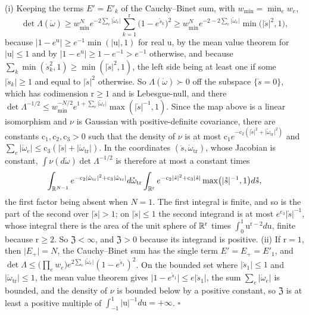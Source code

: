 (i) Keeping the terms \(E'=E'_k\) of the Cauchy--Binet sum, with \(w_{\min}=\min_ew_e\),
\[
\det\Lambda(\mathring\omega)
\geq w_{\min}^Ne^{-2\sum_e\lvert\mathring\omega_e\rvert}\sum_{k=1}^{\mathrm r}\bigl(1-e^{\mathring s_k}\bigr)^2
\geq w_{\min}^Ne^{-2-2\sum_e\lvert\mathring\omega_e\rvert}\min\bigl(\lvert\mathring s\rvert^2,1\bigr),
\]
because \(\lvert1-e^{\mathrm u}\rvert\geq e^{-1}\min(\lvert\mathrm u\rvert,1)\) for real \(\mathrm u\), by the mean
value theorem for \(\lvert\mathrm u\rvert\leq1\) and by \(\lvert1-e^{\mathrm u}\rvert\geq1-e^{-1}>e^{-1}\)
otherwise, and because \(\sum_k\min(\mathring s_k^2,1)\geq\min(\lvert\mathring s\rvert^2,1)\), the left side
being at least one if some \(\lvert\mathring s_k\rvert\geq1\) and equal to \(\lvert\mathring s\rvert^2\) otherwise.
So \(\Lambda(\mathring\omega)\succ0\) off the subspace \(\{\mathring s=0\}\), which has codimension
\(\mathrm r\geq1\) and is Lebesgue-null, and there
\(\det\Lambda^{-1/2}\leq w_{\min}^{-N/2}e^{1+\sum_e\lvert\mathring\omega_e\rvert}\max(\lvert\mathring s\rvert^{-1},1)\).
Since the map above is a linear isomorphism and \(\nu\) is Gaussian with positive-definite covariance,
there are constants \(\mathrm c_1,\mathrm c_2,\mathrm c_3>0\) such that the density of \(\nu\) is at most
\(\mathrm c_1e^{-\mathrm c_2(\lvert\mathring s\rvert^2+\lvert\mathring\omega_{\mathrm{tr}}\rvert^2)}\) and
\(\sum_e\lvert\mathring\omega_e\rvert\leq\mathrm c_3(\lvert\mathring s\rvert+\lvert\mathring\omega_{\mathrm{tr}}\rvert)\). In
the coordinates \((\mathring s,\mathring\omega_{\mathrm{tr}})\), whose Jacobian is constant,
\(\int\nu(d\mathring\omega)\det\Lambda^{-1/2}\) is therefore at most a constant times
\[
\int_{\mathbb R^{N-1}}e^{-\mathrm c_2\lvert\mathring\omega_{\mathrm{tr}}\rvert^2+\mathrm c_3\lvert\mathring\omega_{\mathrm{tr}}\rvert}d\mathring\omega_{\mathrm{tr}}
\int_{\mathbb R^{\mathrm r}}e^{-\mathrm c_2\lvert\mathring s\rvert^2+\mathrm c_3\lvert\mathring s\rvert}\max\bigl(\lvert\mathring s\rvert^{-1},1\bigr)d\mathring s,
\]
the first factor being absent when \(N=1\). The first integral is finite, and so is the part of the second
over \(\lvert\mathring s\rvert>1\); on \(\lvert\mathring s\rvert\leq1\) the second integrand is at most
\(e^{\mathrm c_3}\lvert\mathring s\rvert^{-1}\), whose integral there is the area of the unit sphere of
\(\mathbb R^{\mathrm r}\) times \(\int_0^1\mathrm u^{\mathrm r-2}d\mathrm u\), finite because \(\mathrm r\geq2\). So
\(\mathfrak Z<\infty\), and \(\mathfrak Z>0\) because its integrand is positive.
(ii) If \(\mathrm r=1\), then \(\lvert E_+\rvert=N\), the Cauchy--Binet sum has the single term
\(E'=E_+=E'_1\), and
\(\det\Lambda\leq\bigl(\prod_ew_e\bigr)e^{2\sum_e\lvert\mathring\omega_e\rvert}(1-e^{\mathring s_1})^2\). On the
bounded set where \(\lvert\mathring s_1\rvert\leq1\) and \(\lvert\mathring\omega_{\mathrm{tr}}\rvert\leq1\), the mean
value theorem gives \(\lvert1-e^{\mathring s_1}\rvert\leq e\lvert\mathring s_1\rvert\), the sum
\(\sum_e\lvert\mathring\omega_e\rvert\) is bounded, and the density of \(\nu\) is bounded below by a positive
constant, so \(\mathfrak Z\) is at least a positive multiple of
\(\int_{-1}^1\lvert\mathrm u\rvert^{-1}d\mathrm u=+\infty\). \hfill$\square$

